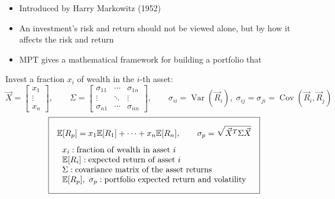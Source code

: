 \begin{itemize}
    \item Introduced by Harry Markowitz (1952)
    \item An investment's risk and return should not be viewed alone, but by how it affects the  risk and return
    \item MPT gives a mathematical framework for building a portfolio that 
\end{itemize}
Invest a fraction $x_i$ of wealth in the $i$-th asset:
\[\vec X = \begin{bmatrix} x_1\\ \vdots\\ x_n\end{bmatrix}, \qquad
\Sigma = \begin{bmatrix} \sigma_{11} & \cdots & \sigma_{1n}\\ \vdots & \ddots & \vdots\\ \sigma_{n1} & \cdots & \sigma_{nn}\end{bmatrix},
\qquad \sigma_{ii} = \operatorname{Var}(\vec R_i),\; \sigma_{ij} = \sigma_{ji} = \operatorname{Cov}(\vec R_i, \vec R_j)\]
\[\boxed{\begin{gathered}
    \E[R_p] = x_1\E[R_1] + \dots + x_n\E[R_n], \qquad \sigma_p = \sqrt{\vec X^T\Sigma\vec X}\\[4pt]
    \begin{array}{@{}l@{}}
        x_i: \text{fraction of wealth in asset } i\\
        \E[R_i]: \text{expected return of asset } i\\
        \Sigma: \text{covariance matrix of the asset returns}\\
        \E[R_p],\ \sigma_p: \text{portfolio expected return and volatility}
    \end{array}
\end{gathered}}\]


